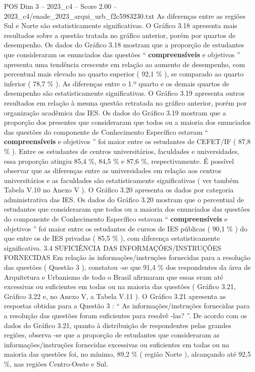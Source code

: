 \begin{textsample}{POS Dim 3 – 2023\_c4 – Score 2.00 – 2023\_c4/enade\_2023\_arqui\_urb\_f2c5983230.txt}
As diferenças entre as regiões Sul e Norte são estatisticamente significativas.
O Gráfico 3.18 apresenta mais resultados sobre a questão tratada no gráfico anterior, porém por quartos de desempenho.
Os dados do Gráfico 3.18 mostram que a proporção de estudantes que consideraram os enunciados das questões “ \textbf{compreensíveis} e objetivos ” apresenta uma tendência crescente em relação ao aumento de desempenho, com percentual mais elevado no quarto superior ( 92,1 \% ), se comparado ao quarto inferior ( 78,7 \% ).
As diferenças entre o 1.º quarto e os demais quartos de desempenho são estatisticamente significativas.
O Gráfico 3.19 apresenta outros resultados em relação à mesma questão retratada no gráfico anterior, porém por organização acadêmica das IES.
Os dados do Gráfico 3.19 mostram que a proporção dos presentes que consideraram que todos ou a maioria dos enunciados das questões do componente de Conhecimento Específico estavam “ \textbf{compreensíveis} e objetivos ” foi maior entre os estudantes de CEFET/IF ( 87,8 \% ).
Entre os estudantes de centros universitários, faculdades e universidades, essa proporção atingiu 85,4 \%, 84,5 \% e 87,6 \%, respectivamente.
É possível observar que as diferenças entre as universidades em relação aos centros universitários e as faculdades são estatisticamente significativas ( ver também Tabela V.10 no Anexo V ).
O Gráfico 3.20 apresenta os dados por categoria administrativa das IES.
Os dados do Gráfico 3.20 mostram que o percentual de estudantes que consideraram que todos ou a maioria dos enunciados das questões do componente de Conhecimento Específico estavam “ \textbf{compreensíveis} e objetivos ” foi maior entre os estudantes de cursos de IES públicas ( 90,1 \% ) do que entre os de IES privadas ( 85,5 \% ), com diferença estatisticamente significativa. 3.4 SUFICIÊNCIA DAS INFORMAÇÕES/INSTRUÇÕES FORNECIDAS Em relação às informações/instruções fornecidas para a resolução das questões ( Questão 3 ), constatou -se que 91,4 \% dos respondentes da área de Arquitetura e Urbanismo de todo o Brasil afirmaram que essas eram até excessivas ou suficientes em todas ou na maioria das questões ( Gráfico 3.21, Gráfico 3.22 e, no Anexo V, a Tabela V.11 ).
O Gráfico 3.21 apresenta as respostas obtidas para a Questão 3 : “ As informações/instruções fornecidas para a resolução das questões foram suficientes para resolvê -las? ”.
De acordo com os dados do Gráfico 3.21, quanto à distribuição de respondentes pelas grandes regiões, observa -se que a proporção de estudantes que consideraram as informações/instruções fornecidas excessivas ou suficientes em todas ou na maioria das questões foi, no mínimo, 89,2 \% ( região Norte ), alcançando até 92,5 \%, nas regiões Centro-Oeste e Sul.

\end{textsample}
